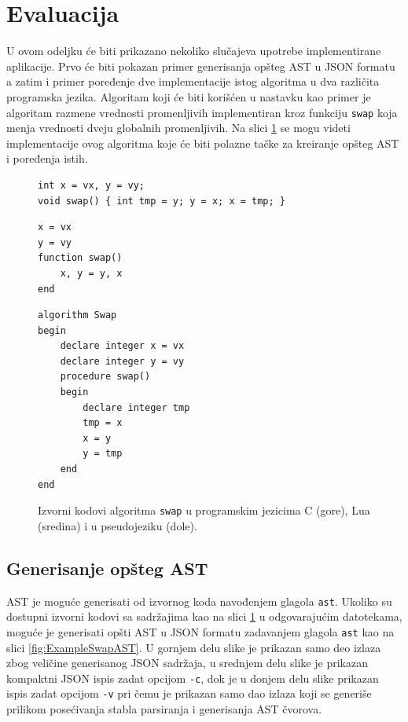 \section{Evaluacija}
\label{sec:ImplementationExample}

U ovom odeljku će biti prikazano nekoliko slučajeva upotrebe implementirane aplikacije. Prvo će biti pokazan primer generisanja opšteg AST u JSON formatu a zatim i primer poređenje dve implementacije istog algoritma u dva različita programska jezika. Algoritam koji će biti korišćen u nastavku kao primer je algoritam razmene vrednosti promenljivih implementiran kroz funkciju \texttt{swap} koja menja vrednosti dveju globalnih promenljivih. Na slici \ref{fig:ExampleSwap} se mogu videti implementacije ovog algoritma koje će biti polazne tačke za kreiranje opšteg AST i poređenja istih.

\begin{figure}[h!]
\begin{lstlisting}
int x = vx, y = vy;
void swap() { int tmp = y; y = x; x = tmp; }
\end{lstlisting}
\begin{lstlisting}
x = vx
y = vy
function swap()
	x, y = y, x
end
\end{lstlisting}
\begin{lstlisting}
algorithm Swap 
begin
    declare integer x = vx
    declare integer y = vy
    procedure swap()
    begin
        declare integer tmp 
        tmp = x
        x = y  
        y = tmp
    end
end
\end{lstlisting}
\caption{Izvorni kodovi algoritma \texttt{swap} u programskim jezicima C (gore), Lua (sredina) i u pseudojeziku (dole).}
\label{fig:ExampleSwap}
\end{figure}


\subsection{Generisanje opšteg AST}
\label{subsec:ImplementationExampleAST}

AST je moguće generisati od izvornog koda navođenjem glagola \texttt{ast}. Ukoliko su dostupni izvorni kodovi sa sadržajima kao na slici \ref{fig:ExampleSwap} u odgovarajućim datotekama, moguće je generisati opšti AST u JSON formatu zadavanjem glagola \texttt{ast} kao na slici \ref{fig:ExampleSwapAST}. U gornjem delu slike je prikazan samo deo izlaza zbog veličine generisanog JSON sadržaja, u srednjem delu slike je prikazan kompaktni JSON ispis zadat opcijom \texttt{-c}, dok je u donjem delu slike prikazan ispis zadat opcijom \texttt{-v} pri čemu je prikazan samo dao izlaza koji se generiše prilikom posećivanja stabla parsiranja i generisanja AST čvorova.

